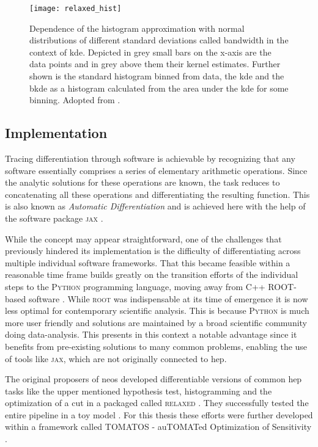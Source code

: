 \begin{figure}
    \centering
    \texttt{[image: relaxed\_hist]}
    \caption[]{Dependence of the histogram approximation with normal distributions of different standard deviations called bandwidth in the context of \ac{kde}. Depicted in grey small bars on the x-axis are the data points and in grey above them their kernel estimates. Further shown is the standard histogram binned from data, the \ac{kde} and the \ac{bkde} as a histogram calculated from the area under the \ac{kde} for some binning. Adopted from \citep{Simpson_2023}.}
    \label{fig:relaxed_hist}
\end{figure}



\subsection{Implementation}
Tracing differentiation through software is achievable by recognizing that any software essentially comprises a series of elementary arithmetic operations. Since the analytic solutions for these operations are known, the task reduces to concatenating all these operations and differentiating the resulting function. This is also known as \textit{Automatic Differentiation} and is achieved here with the help of the software package \textsc{jax} \citep{jax2018github}.

While the concept may appear straightforward, one of the challenges that previously hindered its implementation is the difficulty of differentiating across multiple individual software frameworks. That this became feasible within a reasonable time frame builds greatly on the transition efforts  of the individual steps to the \textsc{Python} programming language, moving away from C++ \textsc{ROOT}-based software \citep{ANTCHEVA20092499}. While \textsc{root} was indispensable at its time of emergence it is now less optimal for contemporary scientific analysis. This is because \textsc{Python} is much more user friendly and solutions are maintained by a broad scientific community doing data-analysis. This presents in this context a notable advantage since it benefits from pre-existing solutions to many common problems, enabling the use of tools like \textsc{jax}, which are not originally connected to \ac{hep}.

The original proposers \citet{Simpson_2023} of \ac{neos} developed differentiable versions of common \ac{hep} tasks like the upper mentioned hypothesis test, histogramming and the optimization of a cut in a packaged called \textsc{relaxed} \citep{Simpson_relaxed_version_0_3_0_2023}. They successfully tested the entire pipeline in a toy model \citep{Simpson_neos_version_0_2_0_2021}. For this thesis these efforts were further developed within a framework called TOMATOS - auTOMATed Optimization of Sensitivity \citep{tomatos}.



